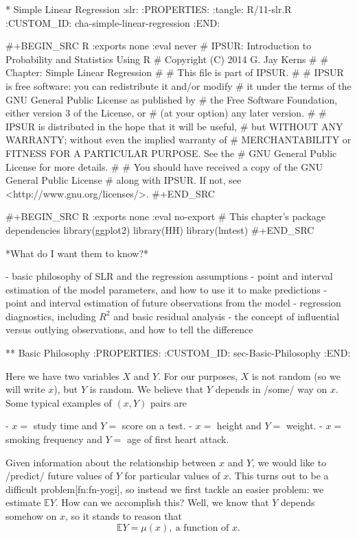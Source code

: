 * Simple Linear Regression                                              :slr:
:PROPERTIES:
:tangle: R/11-slr.R
:CUSTOM_ID: cha-simple-linear-regression
:END:

#+BEGIN_SRC R :exports none :eval never
#    IPSUR: Introduction to Probability and Statistics Using R
#    Copyright (C) 2014  G. Jay Kerns
#
#    Chapter: Simple Linear Regression
#
#    This file is part of IPSUR.
#
#    IPSUR is free software: you can redistribute it and/or modify
#    it under the terms of the GNU General Public License as published by
#    the Free Software Foundation, either version 3 of the License, or
#    (at your option) any later version.
#
#    IPSUR is distributed in the hope that it will be useful,
#    but WITHOUT ANY WARRANTY; without even the implied warranty of
#    MERCHANTABILITY or FITNESS FOR A PARTICULAR PURPOSE.  See the
#    GNU General Public License for more details.
#
#    You should have received a copy of the GNU General Public License
#    along with IPSUR.  If not, see <http://www.gnu.org/licenses/>.
#+END_SRC

#+BEGIN_SRC R :exports none :eval no-export
# This chapter's package dependencies
library(ggplot2)
library(HH)
library(lmtest)
#+END_SRC

*What do I want them to know?*

- basic philosophy of SLR and the regression assumptions
- point and interval estimation of the model parameters, and how to
  use it to make predictions
- point and interval estimation of future observations from the model
- regression diagnostics, including \( R^{2} \) and basic residual
  analysis
- the concept of influential versus outlying observations, and how to
  tell the difference

** Basic Philosophy
:PROPERTIES:
:CUSTOM_ID: sec-Basic-Philosophy
:END:

Here we have two variables \(X\) and \(Y\). For our purposes, \(X\) is
not random (so we will write \(x\)), but \(Y\) is random. We believe
that \(Y\) depends in /some/ way on \(x\). Some typical examples of \(
(x,Y) \) pairs are

- \( x = \) study time and \( Y = \) score on a test.
- \( x = \) height and \( Y = \) weight.
- \( x = \) smoking frequency and \( Y = \) age of first heart attack.

Given information about the relationship between \(x\) and \(Y\), we
would like to /predict/ future values of \(Y\) for particular values
of \(x\). This turns out to be a difficult problem[fn:fn-yogi], so
instead we first tackle an easier problem: we estimate \( \mathbb{E} Y
\). How can we accomplish this? Well, we know that \(Y\) depends
somehow on \(x\), so it stands to reason that
\begin{equation}
\mathbb{E} Y = \mu(x),\ \mbox{a function of }x.
\end{equation}

